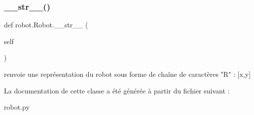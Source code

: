 \subsubsection{\texorpdfstring{\+\_\+\+\_\+str\+\_\+\+\_\+()}{\_\_str\_\_()}}
{\footnotesize\ttfamily def robot.\+Robot.\+\_\+\+\_\+str\+\_\+\+\_\+ (\begin{DoxyParamCaption}\item[{}]{self }\end{DoxyParamCaption})}

\begin{DoxyVerb}renvoie une représentation du robot sous forme de chaîne de caractères
    "R" : [x,y]
\end{DoxyVerb}
 

La documentation de cette classe a été générée à partir du fichier suivant \+:\begin{DoxyCompactItemize}
\item 
robot.\+py\end{DoxyCompactItemize}
